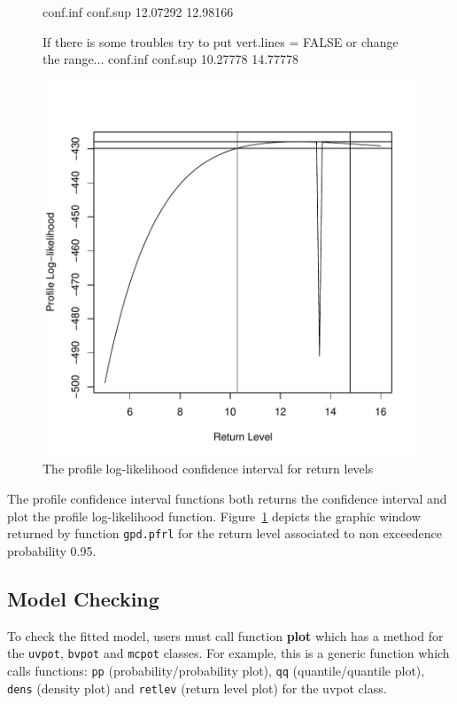 \documentclass[a4paper]{article}
\numberwithin{equation}{section}
\theoremstyle{definition}
\begin{document}
\begin{figure}
\centering
\begin{Schunk}
\begin{Soutput}
conf.inf conf.sup 
12.07292 12.98166 
\end{Soutput}
\begin{Soutput}
If there is some troubles try to put vert.lines = FALSE or change
 the range...
conf.inf conf.sup 
10.27778 14.77778 
\end{Soutput}
\end{Schunk}
\includegraphics{guide-025}
\caption{The profile log-likelihood confidence interval for return
  levels} 
\label{fig:pfrl}
\end{figure}

The profile confidence interval functions both returns the confidence
interval and plot the profile log-likelihood
function. Figure~\ref{fig:pfrl} depicts the graphic window returned by
function \verb|gpd.pfrl| for the return level associated to non
exceedence probability 0.95.

\subsection{Model Checking}
\label{subsec:modCheck}


To check the fitted model, users must call function \textbf{plot}
which has a method for the \verb|uvpot|, \verb|bvpot| and \verb|mcpot|
classes. For example, this is a generic function which calls
functions: \verb|pp| (probability/probability plot), \verb|qq|
(quantile/quantile plot), \verb|dens| (density plot) and
\verb|retlev| (return level plot) for the uvpot class.
\end{document}
